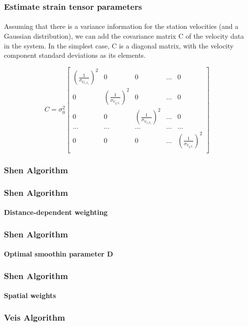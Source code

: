 \begin{frame}
 \frametitle{Estimate strain tensor parameters}
 \framesubtitle{}
 \label{ch2:}
 
 Assuming that there is a variance information for the station velocities (and a Gaussian distribution), we can add the covariance matrix C  of the velocity data in the system. In the simplest case, C is a diagonal matrix, with the velocity component standard deviations as its elements.
 
 \[
 C = \sigma_{0}^{2} 
 \begin{bmatrix}
 (\frac{1}{\sigma_{V_{x_{1}S_{1}}}})^{2} & 0 & 0  & ... & 0\\
 0 & (\frac{1}{\sigma_{V_{y_{1}S_{1}}}})^{2} & 0  & ... & 0\\
 0 & 0 & ({\frac{1}{\sigma_{V_{x_{2}S_{2}}}}})^{2} & ... & 0\\
 ... &  ... & ... & ... & ...\\
 0 & 0 & 0 & ... & (\frac{1}{\sigma_{V_{y_{i}S_{i}}}})^{2}\\
 \end{bmatrix}
 \]

\end{frame}
\note{}


\begin{frame}
 \frametitle{Shen Algorithm}
 \framesubtitle{}
 \label{ch2:}

\end{frame}
\note{}


\begin{frame}
 \frametitle{Shen Algorithm}
 \framesubtitle{Distance-dependent weighting}
 \label{ch2:}

\end{frame}
\note{}

\begin{frame}
 \frametitle{Shen Algorithm}
 \framesubtitle{Optimal smoothin parameter D}
 \label{ch2:}

\end{frame}
\note{}

\begin{frame}
 \frametitle{Shen Algorithm}
 \framesubtitle{Spatial weights}
 \label{ch2:}

\end{frame}
\note{}

\begin{frame}
 \frametitle{Veis Algorithm}
 \framesubtitle{}
 \label{ch2:}

\end{frame}
\note{}




